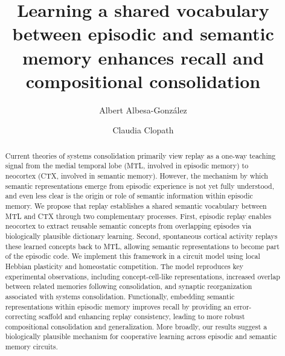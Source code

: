 \documentclass{article}
\title{Learning a shared vocabulary between episodic and semantic memory enhances recall and compositional consolidation}
\author[1]{Albert Albesa-González}
\author[1]{Claudia Clopath}
\affil[1]{Department of Bioengineering, Imperial College London, London, UK}
\begin{document}
\maketitle
\begin{abstract}
\noindent Current theories of systems consolidation primarily view replay as a one-way teaching signal from the medial temporal lobe (MTL, involved in episodic memory) to neocortex (CTX, involved in semantic memory). However, the mechanism by which semantic representations emerge from episodic experience is not yet fully understood, and even less clear is the origin or role of semantic information within episodic memory. We propose that replay establishes a shared semantic vocabulary between MTL and CTX through two complementary processes. First, episodic replay enables neocortex to extract reusable semantic concepts from overlapping episodes via biologically plausible dictionary learning. Second, spontaneous cortical activity replays these learned concepts back to MTL, allowing semantic representations to become part of the episodic code. We implement this framework in a circuit model using local Hebbian plasticity and homeostatic competition. The model reproduces key experimental observations, including concept-cell-like representations, increased overlap between related memories following consolidation, and synaptic reorganization associated with systems consolidation. Functionally, embedding semantic representations within episodic memory improves recall by providing an error-correcting scaffold and enhancing replay consistency, leading to more robust compositional consolidation and generalization. More broadly, our results suggest a biologically plausible mechanism for cooperative learning across episodic and semantic memory circuits.
\end{abstract}
\end{document}
